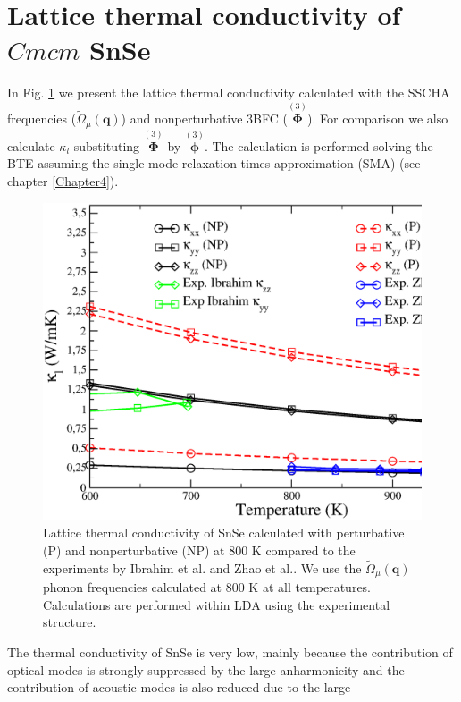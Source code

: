 \section{Lattice thermal conductivity of $Cmcm$ SnSe}

In Fig. \ref{thermal-snse} we present the lattice thermal conductivity calculated with the SSCHA frequencies ($\tilde{\Omega}_{\mu}(\boldsymbol{q})$) and nonperturbative 3BFC ($\overset{(3)}{\boldsymbol{\Phi}}$). For comparison 
we also calculate $\kappa_{l}$ substituting $\overset{(3)}{\boldsymbol{\Phi}}$ by $\overset{(3)}{\boldsymbol{\phi}}$. The calculation is performed solving the BTE assuming the single-mode relaxation times approximation (SMA) (see 
chapter \ref{Chapter4}).
\begin{figure}[h]
\includegraphics[width=\linewidth]{Figures/tk-snse.eps}
\caption[Lattice thermla conductivity of SnSe]{Lattice thermal conductivity of SnSe calculated with perturbative (P) and nonperturbative (NP) at $800$ K compared to the experiments by Ibrahim et al.\cite{ibrahim2017reinvestigation} 
and Zhao et al.\cite{zhao2014ultralow}. We use the $\tilde{\Omega}_{\mu}(\mathbf{q})$ phonon frequencies calculated at $800$ K at all temperatures. Calculations are performed within LDA using the experimental structure.}
\label{thermal-snse}
\end{figure}
The thermal conductivity of SnSe is very low, mainly because the contribution of optical modes is strongly suppressed by the large anharmonicity and the contribution of acoustic modes is also reduced due to the large 
